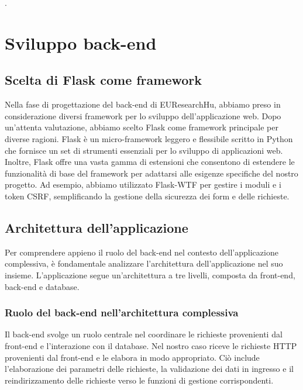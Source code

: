 \documentclass{report}
\begin{document}
.
\chapter{Sviluppo back-end}

\section{Scelta di Flask come framework}
Nella fase di progettazione del back-end di EUResearchHu,  abbiamo preso in considerazione diversi framework per lo sviluppo dell'applicazione web. Dopo un'attenta valutazione, abbiamo scelto Flask come framework principale per diverse ragioni.
Flask è un micro-framework leggero e flessibile scritto in Python che fornisce un set di strumenti essenziali per lo sviluppo di applicazioni web. 
Inoltre, Flask offre una vasta gamma di estensioni che consentono di estendere le funzionalità di base del framework per adattarsi alle esigenze specifiche del nostro progetto. Ad esempio, abbiamo utilizzato Flask-WTF per gestire i moduli e i token CSRF, semplificando la gestione della sicurezza dei form e delle richieste.
\section{Architettura dell'applicazione}
Per comprendere appieno il ruolo del back-end nel contesto dell'applicazione complessiva, è fondamentale analizzare l'architettura dell'applicazione nel suo insieme.
L'applicazione segue un'architettura a tre livelli, composta da front-end, back-end e database. \\
\subsection{Ruolo del back-end nell'architettura complessiva}
Il back-end svolge un ruolo centrale nel coordinare le richieste provenienti dal front-end e l'interazione con il database. Nel nostro caso riceve le richieste HTTP provenienti dal front-end e le elabora in modo appropriato. Ciò include l'elaborazione dei parametri delle richieste, la validazione dei dati in ingresso e il reindirizzamento delle richieste verso le funzioni di gestione corrispondenti.\\
\end{document}
